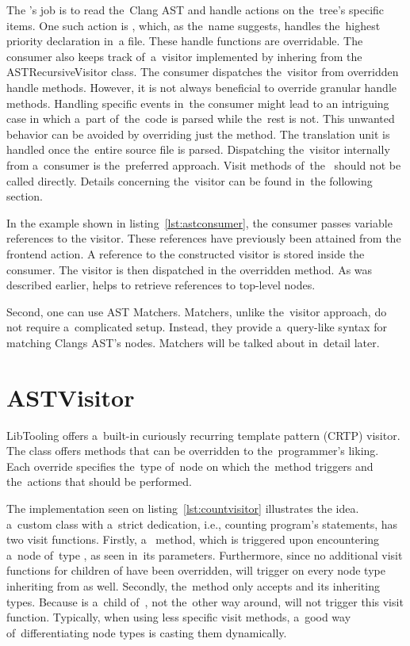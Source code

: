 The 's job is to read the~Clang AST and handle actions
on the~tree's specific items. 
One such action is , which, as the~name suggests,
handles the~highest priority declaration in~a file. 
These handle functions are overridable. 
The consumer also keeps track of~a~visitor implemented by inhering from 
the ASTRecursiveVisitor class. 
The consumer dispatches the~visitor from overridden handle methods. 
However, it is not always beneficial to override granular handle methods. 
Handling specific events in~the consumer might lead to an intriguing case 
in which a~part of~the~code is parsed while the~rest is not. 
This unwanted behavior can be avoided by overriding just 
the  method. 
The translation unit is handled once the~entire source file is parsed. 
Dispatching the~visitor internally from a~consumer is the~preferred 
approach. 
Visit methods of~the~ should not be called 
directly. 
Details concerning the~visitor can be found in~the following section.

In the example shown in listing~\ref{lst:astconsumer}, the consumer passes 
variable references to the visitor. 
These references have previously been attained from the frontend action. 
A reference to the constructed visitor is stored inside the consumer. 
The visitor is then dispatched in the overridden 
 method. 
As was described earlier,  helps to retrieve references 
to top-level nodes.

Second, one can use AST Matchers. 
Matchers, unlike the~visitor approach, do not require a~complicated setup. 
Instead, they provide a~query-like syntax for matching Clangs AST's nodes. 
Matchers will be talked about in~detail later.

\section{ASTVisitor}

LibTooling offers a~built-in curiously recurring template pattern 
(CRTP) visitor. 
The class  \citep{visitor:online} 
offers  methods that 
can be overridden to the~programmer's liking. 
Each override specifies the~type of~node on which the~method 
triggers and the~actions that should be performed.

The implementation seen on listing~\ref{lst:countvisitor} illustrates
the idea. a~custom class with a~strict dedication, i.e., counting
program's statements, has two visit functions.
Firstly, a~ method, which is triggered upon
encountering a~node of~type , as seen in~its
parameters. 
Furthermore, since no additional visit functions for children 
of  have been overridden, 
will trigger on every node type inheriting from  as well.
Secondly, the~method  only accepts 
and its inheriting types.
Because  is a~child of~, not the~other way
around,  will not trigger this visit function.
Typically, when using less specific visit methods, a~good 
way of~differentiating node types is casting them dynamically.

